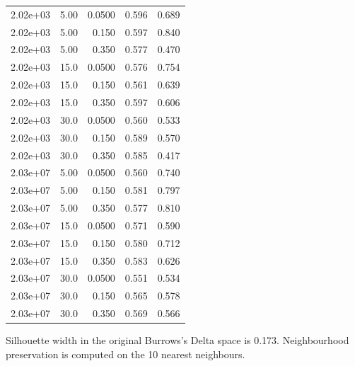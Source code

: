 \begin{table}[htbp]
\begin{tabular}{lrrrr}
2.02e+03 & 5.00 & 0.0500 & 0.596 & 0.689 \\
2.02e+03 & 5.00 & 0.150 & 0.597 & 0.840 \\
2.02e+03 & 5.00 & 0.350 & 0.577 & 0.470 \\
2.02e+03 & 15.0 & 0.0500 & 0.576 & 0.754 \\
2.02e+03 & 15.0 & 0.150 & 0.561 & 0.639 \\
2.02e+03 & 15.0 & 0.350 & 0.597 & 0.606 \\
2.02e+03 & 30.0 & 0.0500 & 0.560 & 0.533 \\
2.02e+03 & 30.0 & 0.150 & 0.589 & 0.570 \\
2.02e+03 & 30.0 & 0.350 & 0.585 & 0.417 \\
2.03e+07 & 5.00 & 0.0500 & 0.560 & 0.740 \\
2.03e+07 & 5.00 & 0.150 & 0.581 & 0.797 \\
2.03e+07 & 5.00 & 0.350 & 0.577 & 0.810 \\
2.03e+07 & 15.0 & 0.0500 & 0.571 & 0.590 \\
2.03e+07 & 15.0 & 0.150 & 0.580 & 0.712 \\
2.03e+07 & 15.0 & 0.350 & 0.583 & 0.626 \\
2.03e+07 & 30.0 & 0.0500 & 0.551 & 0.534 \\
2.03e+07 & 30.0 & 0.150 & 0.565 & 0.578 \\
2.03e+07 & 30.0 & 0.350 & 0.569 & 0.566 \\
\bottomrule
\end{tabular}
\vspace{0.5em}
\begin{minipage}{\linewidth}\footnotesize Silhouette width in the original Burrows's Delta space is 0.173. Neighbourhood preservation is computed on the 10 nearest neighbours.\end{minipage}
\end{table}


